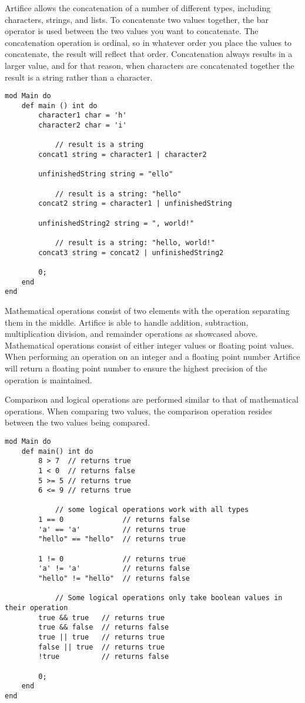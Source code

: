 \documentclass{article}
\begin{document}
Artifice allows the concatenation of a number of different types, including characters, strings, and lists. To concatenate two values together, the bar operator 
is used between the two values you want to concatenate. The concatenation operation is ordinal, so in whatever order you place the values to concatenate, the
result will reflect that order. Concatenation always results in a larger value, and for that reason, when characters are concatenated together the result is a
string rather than a character.

\begin{lstlisting}
mod Main do
	def main () int do
		character1 char = 'h'
		character2 char = 'i'

			// result is a string
		concat1 string = character1 | character2

		unfinishedString string = "ello"

			// result is a string: "hello"
		concat2 string = character1 | unfinishedString

		unfinishedString2 string = ", world!"

			// result is a string: "hello, world!"
		concat3 string = concat2 | unfinishedString2

		0;
	end
end
\end{lstlisting}

Mathematical operations consist of two elements with the operation separating them in the middle. Artifice is able to handle addition, subtraction, multiplication
division, and remainder operations as showcased above. Mathematical operations consist of either integer values or floating point values. When performing an
operation on an integer and a floating point number Artifice will return a floating point number to ensure the highest precision of the operation is maintained.

Comparison and logical operations are performed similar to that of mathematical operations. When comparing two values, the comparison operation resides between the two
values being compared.

\begin{lstlisting}
mod Main do
	def main() int do
		8 > 7  // returns true
		1 < 0  // returns false
		5 >= 5 // returns true
		6 <= 9 // returns true

			// some logical operations work with all types
		1 == 0      		// returns false
		'a' == 'a'  		// returns true
		"hello" == "hello"  // returns true

		1 != 0 			    // returns true
		'a' != 'a'  		// returns false
		"hello" != "hello"  // returns false

			// Some logical operations only take boolean values in their operation
		true && true   // returns true
		true && false  // returns false
		true || true   // returns true
		false || true  // returns true
		!true		   // returns false

		0;
	end
end
\end{lstlisting}
\end{document}

